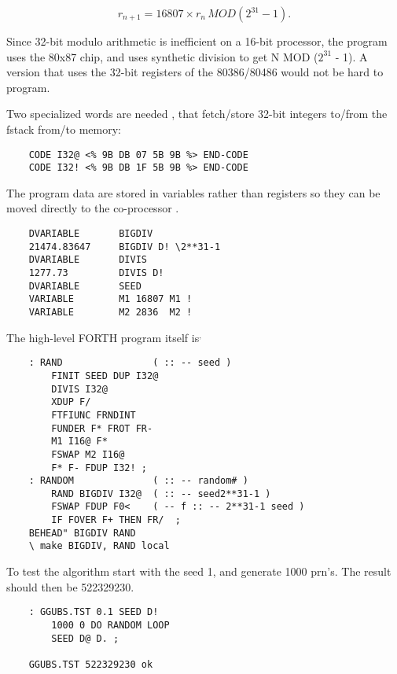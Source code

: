 \begin{equation}
    r_{n+1} = 16807 \times{} r_n \, MOD (2^{31} - 1) .\nonumber
\end{equation}

Since 32-bit modulo arithmetic is inefficient on a 16-bit processor, the
program uses the 80x87 chip, and uses synthetic division
to get N MOD ($2^{31}$ - 1). A version that uses the 32-bit registers
of the 80386/80486 would not be hard to program.

Two specialized words are needed 
, that fetch/store 32-bit integers to/from the fstack from/to memory:

\begin{lstlisting}
    CODE I32@ <% 9B DB 07 5B 9B %> END-CODE
    CODE I32! <% 9B DB 1F 5B 9B %> END-CODE
\end{lstlisting}

The program data are stored in variables rather than registers so
they can be moved directly to the co-processor  .

\begin{lstlisting}
    DVARIABLE       BIGDIV
    21474.83647     BIGDIV D! \2**31-1
    DVARIABLE       DIVIS
    1277.73         DIVIS D!
    DVARIABLE       SEED
    VARIABLE        M1 16807 M1 !
    VARIABLE        M2 2836  M2 !
\end{lstlisting}

The high-level FORTH program itself is$^,$

\begin{lstlisting}
    : RAND                ( :: -- seed )
        FINIT SEED DUP I32@
        DIVIS I32@
        XDUP F/
        FTFIUNC FRNDINT
        FUNDER F* FROT FR-
        M1 I16@ F*
        FSWAP M2 I16@
        F* F- FDUP I32! ;
    : RANDOM              ( :: -- random# )
        RAND BIGDIV I32@  ( :: -- seed2**31-1 )
        FSWAP FDUP F0<    ( -- f :: -- 2**31-1 seed )
        IF FOVER F+ THEN FR/  ;
    BEHEAD" BIGDIV RAND
    \ make BIGDIV, RAND local
\end{lstlisting}
To test the algorithm start with the seed 1, and generate 1000 prn's. The result should then be 522329230.

\begin{lstlisting}
    : GGUBS.TST 0.1 SEED D!
        1000 0 DO RANDOM LOOP
        SEED D@ D. ;

    GGUBS.TST 522329230 ok
\end{lstlisting}

